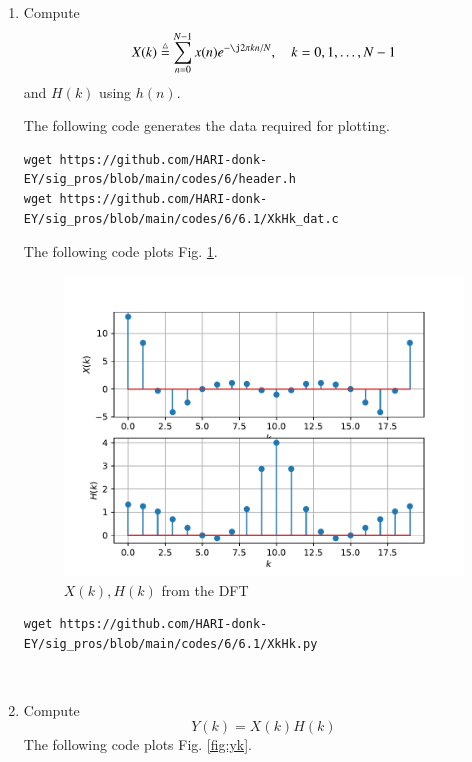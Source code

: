 \documentclass[journal,12pt,twocolumn]{IEEEtran}
\renewcommand\thesection{\arabic{section}}
\begin{document}
\begin{enumerate}[label=\thesection.\arabic*]

\item
Compute
\begin{equation}
X(k) \define \sum _{n=0}^{N-1}x(n) e^{-\j2\pi kn/N}, \quad k = 0,1,\dots, N-1
\end{equation}
and $H(k)$ using $h(n)$.

\solution 
The following code generates the data required for plotting.
\begin{lstlisting}
wget https://github.com/HARI-donk-EY/sig_pros/blob/main/codes/6/header.h
wget https://github.com/HARI-donk-EY/sig_pros/blob/main/codes/6/6.1/XkHk_dat.c 
\end{lstlisting}

The following code plots Fig. \ref{fig:xkhk}. 
\begin{figure}[!ht]
\centering
\includegraphics[width=\columnwidth]{./figs/xkhk}
\caption{$X(k) ,H(k)$ from the DFT}
\label{fig:xkhk}
\end{figure}
\begin{lstlisting}
wget https://github.com/HARI-donk-EY/sig_pros/blob/main/codes/6/6.1/XkHk.py
\end{lstlisting}
\ \\
\item
Compute 
\begin{equation}
Y(k) = X(k)H(k)
\end{equation}
\solution The following code plots Fig. \ref{fig:yk}. 
\begin{figure}[!ht]
\centering

\end{figure}
\end{enumerate}
\end{document}

